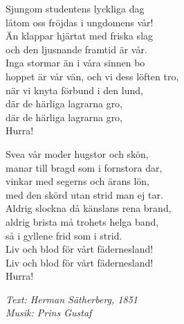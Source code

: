 \vspace{10pt}
Sjungom studentens lyckliga dag\\
låtom oss fröjdas i ungdomens vår!\\
Än klappar hjärtat med friska slag\\
och den ljusnande framtid är vår.\\
Inga stormar än i våra sinnen bo\\
hoppet är vår vän, och vi dess löften tro,\\
när vi knyta förbund i den lund,\\
där de härliga lagrarna gro,\\
där de härliga lagrarna gro,\\
Hurra!\par
\vspace{10pt}
Svea vår moder hugstor och skön,\\
manar till bragd som i fornstora dar,\\
vinkar med segerns och ärans lön,\\
med den skörd utan strid man ej tar.\\
Aldrig slockna då känslans rena brand,\\
aldrig brista må trohets helga band,\\
så i gyllene frid som i strid.\\
Liv och blod för vårt fädernesland!\\
Liv och blod för vårt fädernesland!\\
Hurra!\par
\vspace{10pt}
{\footnotesize\textit{Text: Herman Sätherberg, 1851\\Musik: Prins Gustaf}}

